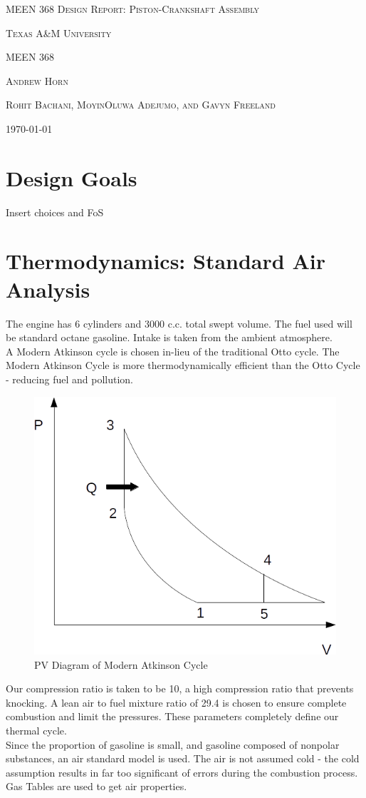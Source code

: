 \documentclass[10pt,a4paper]{article}
\begin{document}
\begin{titlepage}
		\centering
		{\scshape\Huge MEEN 368 Design Report: Piston-Crankshaft Assembly}	
		\vspace{1cm}	
		
		{\scshape\Large Texas A\&M University}
		
		{\scshape \large MEEN 368}
		
		\vspace{3 cm}
		
	{\scshape \normalsize Andrew Horn}		
		
		{\scshape \normalsize Rohit Bachani, MoyinOluwa Adejumo, and Gavyn Freeland}

		

		\vfill
		
		{\Large \today}
	\end{titlepage}
\section*{Design Goals}
Insert choices and FoS
\newpage
\section*{Thermodynamics: Standard Air Analysis}

The engine has 6 cylinders and 3000 c.c. total swept volume. The fuel used will be standard octane gasoline. Intake is taken from the ambient atmosphere.\\
	A Modern Atkinson cycle is chosen in-lieu of the traditional Otto cycle. The Modern Atkinson Cycle is more thermodynamically efficient than the Otto Cycle - reducing fuel and pollution.
	\begin{figure}[h]
		\centering
		\includegraphics[width=.5\textwidth]{ThermoDiagram.png}
		\caption{PV Diagram of Modern Atkinson Cycle}
		\label{fig:diagram1}
	\end{figure}
	
	Our compression ratio is taken to be 10, a high compression ratio that prevents knocking.
	A lean air to fuel mixture ratio of 29.4 is chosen to ensure complete combustion and limit the pressures. These parameters completely define our thermal cycle.\\ Since the proportion of gasoline is small, and gasoline composed of nonpolar substances, an air standard model is used. The air is not assumed cold - the cold assumption results in far too significant of errors during the combustion process. Gas Tables are used to get air properties.
\end{document}
